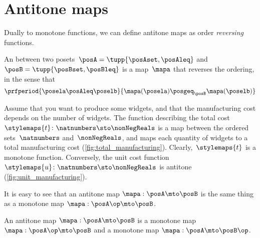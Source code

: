 \section{Antitone maps}

Dually to monotone functions, we can define antitone maps as order \emph{reversing} functions.

\begin{definition}
    \label{def:antitone}
    An \emph{} between two posets~$\posA=\tupp{\posAset, \posAleq}$ and~$\posB=\tupp{\posBset, \posBleq}$ is a map~$\mapa$ that reverses the ordering, in the sense that
    \begin{equation}
        \prfperiod{
            \posela \posAleq \poselb
        }{
            \mapa(\posela) \posgeq_\posB \mapa(\poselb)
        }
    \end{equation}
\end{definition}

\begin{example}
    Assume that you want to produce some widgets, and that the manufacturing cost depends on the number of widgets.
    The function describing the total cost~$\stylemaps{t}\colon \natnumbers \sto \nonNegReals$ is a map between the ordered sets~$\natnumbers$ and~$\nonNegReals$, and maps each quantity of widgets to a total manufacturing cost (\cref{fig:total_manufacturing}).
    Clearly,~$\stylemaps{t}$ is a monotone function.
    Conversely, the unit cost function~$\stylemaps{u}\colon \natnumbers \sto \nonNegReals$ is antitone (\cref{fig:unit_manufacturing}).
\end{example}

\begin{figure}[h!]
\end{figure}

It is easy to see that an antitone map $\mapa: \posA \mto \posB$ is the same thing as a monotone map $\mapa: \posA\op \mto \posB$.

\begin{lemma}\label{lem:antitone-is-monotone}
    An antitone map  $\mapa: \posA \mto \posB$ is a monotone map $\mapa: \posA\op \mto \posB$
    and a monotone map $\mapa: \posA \mto \posB\op$.
\end{lemma}
